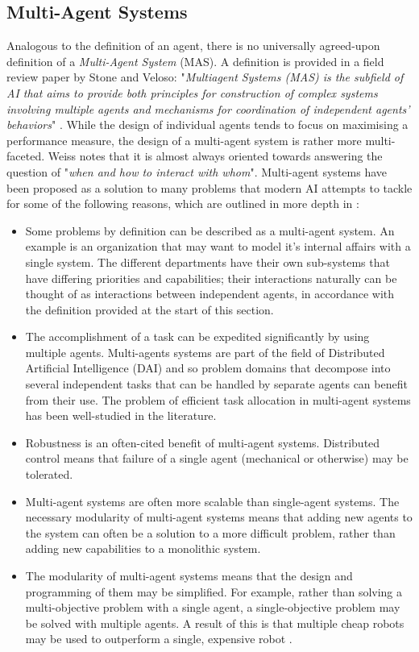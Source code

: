 \subsection{Multi-Agent Systems}
Analogous to the definition of an agent, there is no universally agreed-upon definition of a \emph{Multi-Agent System} (MAS). A definition is provided in a field review paper by Stone and Veloso: "\textit{Multiagent Systems (MAS) is the subfield of AI that aims to provide both principles for construction of  complex  systems  involving  multiple  agents  and  mechanisms  for  coordination  of  independent  agents’ behaviors}" \cite{Stone2000MultiagentPerspective}. While the design of individual agents tends to focus on maximising a performance measure, the design of a multi-agent system is rather more multi-faceted. Weiss \cite{MAS:AModernApproachToDAI} notes that it is almost always oriented towards answering the question of "\textit{when and how to interact with whom}". Multi-agent systems have been proposed as a solution to many problems that modern AI attempts to tackle for some of the following reasons, which are outlined in more depth in \cite{Stone2000MultiagentPerspective}: 
\begin{itemize}
    \item Some problems by definition can be described as a multi-agent system. An example is an organization that may want to model it's internal affairs with a single system. The different departments have their own sub-systems that have differing priorities and capabilities; their interactions naturally can be thought of as interactions between independent agents, in accordance with the definition provided at the start of this section.
    \item The accomplishment of a task can be expedited significantly by using multiple agents. Multi-agents systems are part of the field of Distributed Artificial Intelligence (DAI) and so problem domains that decompose into several independent tasks that can be handled by separate agents can benefit from their use. The problem of efficient task allocation in multi-agent systems has been well-studied in the literature\cite{Gerkey2004ASystems}. 
    \item Robustness is an often-cited benefit of multi-agent systems. Distributed control means that failure of a single agent (mechanical or otherwise) may be tolerated.
    \item Multi-agent systems are often more scalable than single-agent systems. The necessary modularity of multi-agent systems means that adding new agents to the system can often be a solution to a more difficult problem, rather than adding new capabilities to a monolithic system. 
    \item The modularity of multi-agent systems means that the design and programming of them may be simplified. For example, rather than solving a multi-objective problem with a single agent, a single-objective problem may be solved with multiple agents. A result of this is that multiple cheap robots may be used to outperform a single, expensive robot \cite{Grabowski2000HeterogeneousExploration}.
\end{itemize}
\par

